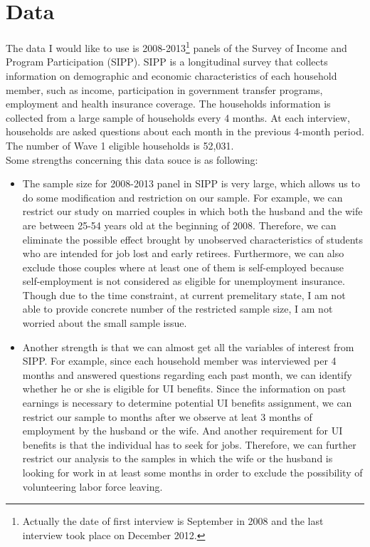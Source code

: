 \documentclass[legalpaper,12pt,margin=1in]{article}
\begin{document}
\section{Data}
The data I would like to use is 2008-2013\footnote{Actually the date of first interview is September in 2008 and the last interview took place on December 2012.} panels of the Survey of Income and Program Participation (SIPP). SIPP is a longitudinal survey that collects information on demographic and economic characteristics of each household member, such as income, participation in government transfer programs, employment and health insurance coverage. The households information is collected from a large sample of households every 4 months. At each interview, households are asked questions about each month in the previous 4-month period. The number of Wave 1 eligible households is 52,031.\\
Some strengths concerning this data souce is as following:
\begin{itemize}
  \item The sample size for 2008-2013 panel in SIPP is very large, which allows us to do some modification and restriction on our sample. For example, we can restrict our study on married couples in which both the husband and the wife are between 25-54 years old at the beginning of 2008. Therefore, we can eliminate the possible effect brought by unobserved characteristics of students who are intended for job lost and early retirees. Furthermore, we can also exclude those couples where at least one of them is self-employed because self-employment is not considered as eligible for unemployment insurance. Though due to the time constraint, at current premelitary state, I am not able to provide concrete number of the restricted sample size, I am not worried about the small sample issue.
  \item Another strength is that we can almost get all the variables of interest from SIPP. For example, since each household member was interviewed per 4 months and answered questions regarding each past month, we can identify whether he or she is eligible for UI benefits. Since the information on past earnings is necessary to determine potential UI benefits assignment,  we can restrict our sample to months after we observe at leat 3 months of employment by the husband or the wife. And another requirement for UI benefits is that the individual has to seek for jobs. Therefore, we can further restrict our analysis to the samples in which the wife or the husband is looking for work in at least some months in order to exclude the possibility of volunteering labor force leaving.
\end{itemize}
\end{document}
